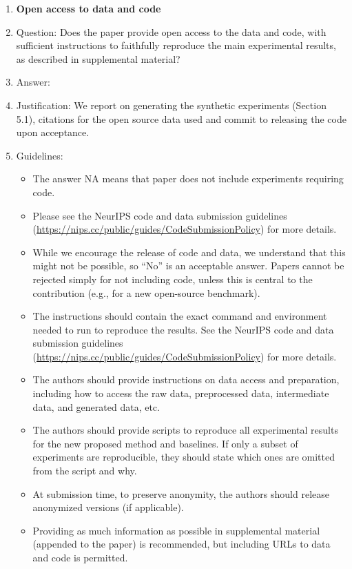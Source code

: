 \documentclass{article}
\theoremstyle{plain}
\theoremstyle{definition}
\theoremstyle{remark}
\begin{document}
\begin{enumerate}
\item {\bf Open access to data and code}
    \item[] Question: Does the paper provide open access to the data and code, with sufficient instructions to faithfully reproduce the main experimental results, as described in supplemental material?
    \item[] Answer: \answerYes{} %
    \item[] Justification: We report on generating the synthetic experiments (Section 5.1),  citations for the open source data used and commit to releasing the code upon acceptance.
    \item[] Guidelines:
    \begin{itemize}
        \item The answer NA means that paper does not include experiments requiring code.
        \item Please see the NeurIPS code and data submission guidelines (\url{https://nips.cc/public/guides/CodeSubmissionPolicy}) for more details.
        \item While we encourage the release of code and data, we understand that this might not be possible, so “No” is an acceptable answer. Papers cannot be rejected simply for not including code, unless this is central to the contribution (e.g., for a new open-source benchmark).
        \item The instructions should contain the exact command and environment needed to run to reproduce the results. See the NeurIPS code and data submission guidelines (\url{https://nips.cc/public/guides/CodeSubmissionPolicy}) for more details.
        \item The authors should provide instructions on data access and preparation, including how to access the raw data, preprocessed data, intermediate data, and generated data, etc.
        \item The authors should provide scripts to reproduce all experimental results for the new proposed method and baselines. If only a subset of experiments are reproducible, they should state which ones are omitted from the script and why.
        \item At submission time, to preserve anonymity, the authors should release anonymized versions (if applicable).
        \item Providing as much information as possible in supplemental material (appended to the paper) is recommended, but including URLs to data and code is permitted.
    \end{itemize}



\end{enumerate}
\end{document}
